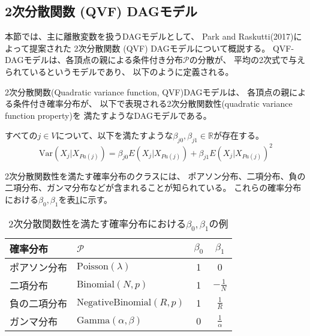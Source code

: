 
\subsection{2次分散関数 (QVF) DAGモデル}

本節では、主に離散変数を扱うDAGモデルとして、
Park and Raskutti(2017)\cite{Park2017-hw}によって提案された
2次分散関数 (QVF) DAGモデルについて概説する。
QVF-DAGモデルは、各頂点の親による条件付き分布$\mathcal P$の分散が、
平均の2次式で与えられているというモデルであり、
以下のように定義される。

\begin{df}
2次分散関数(Quadratic variance function, QVF)DAGモデルは、
各頂点の親による条件付き確率分布が、
以下で表現される2次分散関数性(quadratic variance function property)を
満たすようなDAGモデルである。

すべての$j \in V$について、以下を満たすような$\beta_{j0}, \beta_{j1} \in \mathbb R$が存在する。
  \begin{equation}
      \mathrm{Var}(X_j|X_{Pa(j)}) = \beta_{j0} E(X_j | X_{Pa(j)}) + \beta_{j1} E(X_j | X_{Pa(j)})^2
      \label{QVF}
  \end{equation}
\end{df}

2次分散関数性を満たす確率分布のクラスには、
ポアソン分布、二項分布、負の二項分布、ガンマ分布などが含まれることが知られている。
これらの確率分布における$\beta_0, \beta_1$を表\ref{table:QVF}に示す。

\begin{table}[ht]
  \label{table:QVF}
  \begin{center}
    \begin{tabular}{llcc} \toprule
      確率分布     & $\mathcal{P}$                  & $\beta_0$ & $\beta_1$       \\ \midrule
      ポアソン分布  & $\text{Poisson}(\lambda)$      & 1         & 0               \\
      二項分布     & $\text{Binomial}(N, p)$        & 1         & $-\frac{1}{N}$   \\
      負の二項分布  & $\text{NegativeBinomial}(R,p)$ & 1         & $\frac{1}{R}$    \\
      ガンマ分布   & $\text{Gamma}(\alpha, \beta)$   & 0         & $\frac{1}{\alpha}$ \\ \bottomrule
    \end{tabular}
  \end{center}
  \caption{2次分散関数性を満たす確率分布における$\beta_0, \beta_1$の例}
\end{table}

